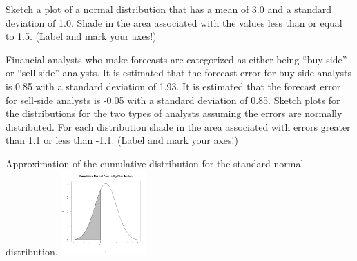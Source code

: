 \begin{problem}
\begin{subproblem}
      \vfill


  \end{subproblem}

\clearpage

\item Sketch a plot of a normal distribution that has a mean of 3.0
  and a standard deviation of 1.0. Shade in the area associated with
  the values less than or equal to 1.5. (Label and mark your axes!)

  \vfill

\item Financial analysts who make forecasts are categorized as either
  being ``buy-side'' or ``sell-side'' analysts. It is estimated that
  the forecast error for buy-side analysts is 0.85 with a standard
  deviation of 1.93. It is estimated that the forecast error for
  sell-side analysts is -0.05 with a standard deviation of
  0.85. Sketch plots for the distributions for the two types of
  analysts assuming the errors are normally distributed. For each
  distribution shade in the area associated with errors greater than
  1.1 or less than -1.1. (Label and mark your axes!)

  \vfill
  
\end{problem}




Approximation of the cumulative distribution for the standard normal distribution. 
\includegraphics[height=3.25cm]{img/cummulativeDist}

